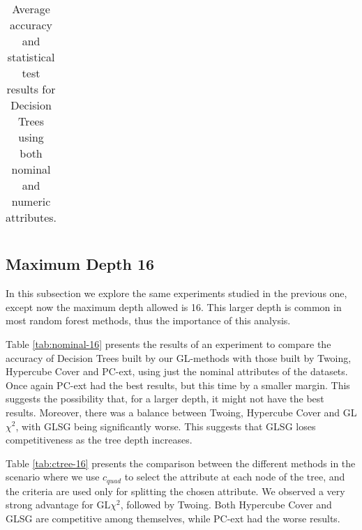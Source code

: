 \begin{table}
\begin{tabular}{c|cc|cc|cc|cc|cc|cc}
\end{tabular}
\caption{Average accuracy and statistical test results for  Decision Trees using both nominal and numeric attributes.}
\label{exp:numeric-5}
\normalsize
\end{table}


\subsection{Maximum Depth 16}

In this subsection we explore the same experiments studied in the previous one, except now the maximum depth allowed is 16. This larger depth is common in most random forest methods, thus the importance of this analysis.

Table \ref{tab:nominal-16} presents the results of an experiment to compare the accuracy of  Decision Trees built by our GL-methods with those built by Twoing, Hypercube Cover and PC-ext, using just the nominal attributes of the datasets. Once again PC-ext had the best results, but this time by a smaller margin. This suggests the possibility that, for a larger depth, it might not have the best results. Moreover, there was a balance between Twoing, Hypercube Cover and GL$\chi^2$, with GLSG being significantly worse. This suggests that GLSG loses competitiveness as the tree depth increases.

Table \ref{tab:ctree-16} presents the comparison between the different methods in the scenario where we use $c_{quad}$ to select the attribute at each node of the tree, and the criteria are used only for splitting the chosen attribute. We observed a very strong advantage for GL$\chi^2$, followed by Twoing. Both Hypercube Cover and GLSG are competitive among themselves, while PC-ext had the worse results.

